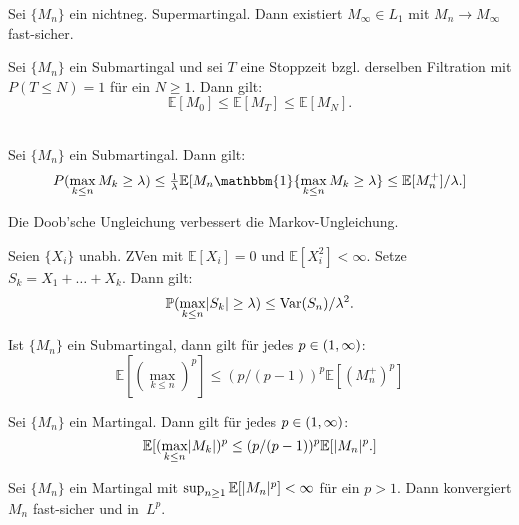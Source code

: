 \documentclass{cheat-sheet}
\renewcommand{\P}{\mathbb{P}} %
\newcommand{\E}{\mathbb{E}} %
\newcommand{\ind}{\mathbbm{1}} %
\DeclareMathOperator{\var}{Var} %
\begin{document}
\begin{kor}
  Sei $\{ M_n \}$ ein nichtneg. Supermartingal.
  Dann existiert $M_\infty \in L_1$ mit $M_n \to M_\infty$ fast-sicher.
\end{kor}



\begin{satz}
  Sei $\{ M_n \}$ ein Submartingal und sei $T$ eine Stoppzeit bzgl. derselben Filtration mit $P(T \leq N) = 1$ für ein $N \geq 1$.
  Dann gilt:
  \[
    \E[M_0] \leq \E[M_T] \leq \E[M_N].
  \]
\end{satz}

\begin{satz} \mbox{}\\
  Sei $\{ M_n \}$ ein Submartingal.
  Dann gilt:
  \[
    P(\max_{k \leq n} M_k \geq \lambda) \leq \tfrac{1}{\lambda} \E[ M_n \ind \{ \max_{k \leq n} M_k \geq \lambda \} \leq \E[ M_n^{+} ] / \lambda. ]
  \]
\end{satz}

\begin{bem}
  Die Doob'sche Ungleichung verbessert die Markov-Ungleichung.
\end{bem}

\begin{kor}
  Seien $\{ X_i \}$ unabh. ZVen mit $\E[ X_i ] = 0$ und $\E[ X_i^2 ] < \infty$.
  Setze $S_k = X_1 + \ldots + X_k$.
  Dann gilt:
  \[ \P(\max_{k \leq n} \abs{S_k} \geq \lambda) \leq \var(S_n) / \lambda^2. \]
\end{kor}

\begin{satz}
  Ist $\{ M_n \}$ ein Submartingal, dann gilt für jedes $p \in \left( 1, \infty \right)$:
  \[
    \E[ (\max_{k \leq n})^p ] \leq (p / (p-1))^p \E[ (M_n^{+})^p ]
  \]
\end{satz}

\begin{kor}
  Sei $\{ M_n \}$ ein Martingal.
  Dann gilt für jedes $p \in \left( 1, \infty \right)$:
  \[
    \E[ (\max_{k \leq n} \abs{M_k})^p \leq (p / (p-1))^p \E[ \abs{M_n}^p. ]
  \]
\end{kor}


\begin{satz}
  Sei $\{ M_n \}$ ein Martingal mit $\sup_{n \geq 1} \E[\abs{M_n}^p] < \infty$ für ein $p > 1$.
  Dann konvergiert $M_n$ fast-sicher und in~$L^p$.
\end{satz}
\end{document}
